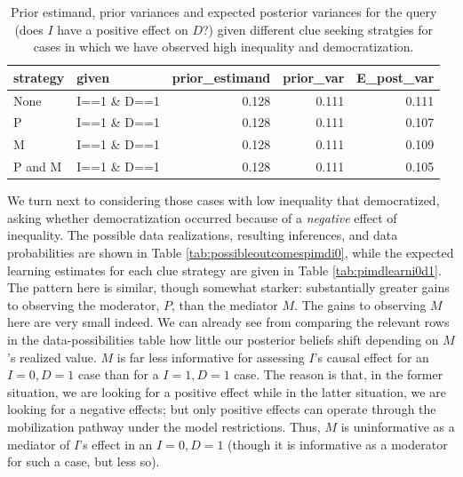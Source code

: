 \documentclass[
  12pt,
]{book}
\begin{document}
\begin{table}

\caption{\label{tab:pimdlearni1d1} Prior estimand, prior variances and expected posterior variances for the query (does $I$ have a positive effect on $D$?) given different clue seeking  stratgies for cases in which we have observed high inequality and democratization.}
\centering
\begin{tabular}[t]{l|l|r|r|r}
\hline
strategy & given & prior\_estimand & prior\_var & E\_post\_var\\
\hline
None & I==1 \& D==1 & 0.128 & 0.111 & 0.111\\
\hline
P & I==1 \& D==1 & 0.128 & 0.111 & 0.107\\
\hline
M & I==1 \& D==1 & 0.128 & 0.111 & 0.109\\
\hline
P and M & I==1 \& D==1 & 0.128 & 0.111 & 0.105\\
\hline
\end{tabular}
\end{table}

We turn next to considering those cases with low inequality that democratized, asking whether democratization occurred because of a \emph{negative} effect of inequality. The possible data realizations, resulting inferences, and data probabilities are shown in Table \ref{tab:possibleoutcomespimdi0}, while the expected learning estimates for each clue strategy are given in Table \ref{tab:pimdlearni0d1}. The pattern here is similar, though somewhat starker: substantially greater gains to observing the moderator, \(P\), than the mediator \(M\). The gains to observing \(M\) here are very small indeed. We can already see from comparing the relevant rows in the data-possibilities table how little our posterior beliefs shift depending on \(M\)'s realized value. \(M\) is far less informative for assessing \(I\)'s causal effect for an \(I=0, D=1\) case than for a \(I=1, D=1\) case. The reason is that, in the former situation, we are looking for a positive effect while in the latter situation, we are looking for a negative effects; but only positive effects can operate through the mobilization pathway under the model restrictions. Thus, \(M\) is uninformative as a mediator of \(I\)'s effect in an \(I=0, D=1\) (though it is informative as a moderator for such a case, but less so).
\end{document}
